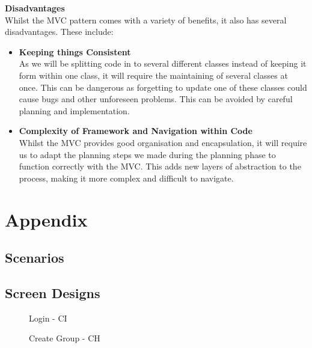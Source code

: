 \documentclass[a4paper]{article}
\begin{document}
\textbf{Disadvantages} \\
Whilst the MVC pattern comes with a variety of benefits, it also has several disadvantages. These include:
\begin{itemize}
    \item \textbf{Keeping things Consistent} \\
    As we will be splitting code in to several different classes instead of keeping it form within one class, it will require the maintaining of several classes at once. This can be dangerous as forgetting to update one of these classes could cause bugs and other unforeseen problems. This can be avoided by careful planning and implementation. \\
    \item \textbf{Complexity of Framework and Navigation within Code} \\
    Whilst the MVC provides good organisation and encapsulation, it will require us to adapt the planning steps we made during the planning phase to function correctly with the MVC. This adds new layers of abstraction to the process, making it more complex and difficult to navigate.
\end{itemize}

\section{Appendix}
\subsection{Scenarios}




\clearpage
\subsection{Screen Designs}
\begin{figure}[!ht]
    \centering{} %
    \caption{Login - CI}
    \label{fig:login}
\end{figure}

\begin{figure}[!ht] 
    \centering{} %
    \caption{Create Group - CH}
    \label{fig:create_group}
\end{figure}
\end{document}
